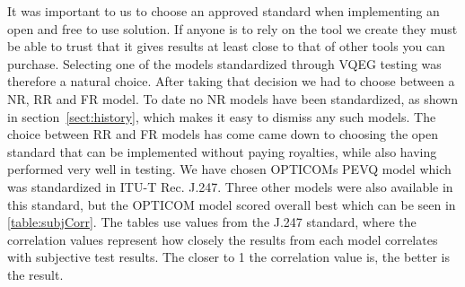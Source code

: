 It was important to us to choose an approved standard when implementing an open and free to use solution. If anyone is to rely on the tool we create they must be able to trust that it gives results at least close to that of other tools you can purchase. Selecting one of the models standardized through VQEG testing was therefore a natural choice. After taking that decision we had to choose between a NR, RR and FR model. To date no NR models have been standardized, as shown in section~\ref{sect:history}, which makes it easy to dismiss any such models. The choice between RR and FR models has come came down to choosing the open standard that can be implemented without paying royalties, while also having performed very well in testing. We have chosen OPTICOMs PEVQ model which was standardized in ITU-T Rec. J.247\cite{j.247}. Three other models were also available in this standard, but the OPTICOM model scored overall best which can be seen in \cref{table:subjCorr}. The tables use values from the J.247 standard, where the correlation values represent how closely the results from each model correlates with subjective test results. The closer to 1 the correlation value is, the better is the result.






\begin{table}[h]

\begin{tablebox}[adjusted title= Subjective test result correlation,%
width=\linewidth]
{}
\end{tablebox}

\caption[Subjective test correlation for the models tested in J.247, also including PSNR.]%
{Subjective test correlation for the models tested in J.247, also including PSNR. $C_{avg}$ and $C_{min}$ represents avg. correlation and min. correlation. \cite{j.247}}%
\label{table:subjCorr}
\end{table}


